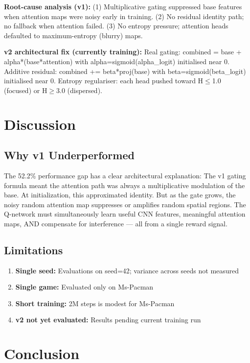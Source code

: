 \documentclass[11pt,a4paper]{article}
\begin{document}
\textbf{Root-cause analysis (v1):}
(1) Multiplicative gating suppressed base features when attention maps were noisy early in training. 
(2) No residual identity path; no fallback when attention failed. 
(3) No entropy pressure; attention heads defaulted to maximum-entropy (blurry) maps.

\textbf{v2 architectural fix (currently training):}
Real gating: combined = base + alpha*(base*attention) with alpha=sigmoid(alpha\_logit) initialised near 0. 
Additive residual: combined += beta*proj(base) with beta=sigmoid(beta\_logit) initialised near 0. 
Entropy regulariser: each head pushed toward H$\le$1.0 (focused) or H$\ge$3.0 (dispersed).

\section{Discussion}

\subsection{Why v1 Underperformed}

The 52.2\% performance gap has a clear architectural explanation: The v1 gating formula meant the attention path was always a multiplicative modulation of the base. At initialization, this approximated identity. But as the gate grows, the noisy random attention map suppresses or amplifies random spatial regions. The Q-network must simultaneously learn useful CNN features, meaningful attention maps, AND compensate for interference --- all from a single reward signal.

\subsection{Limitations}

\begin{enumerate}
    \item \textbf{Single seed:} Evaluations on seed=42; variance across seeds not measured
    \item \textbf{Single game:} Evaluated only on Ms-Pacman
    \item \textbf{Short training:} 2M steps is modest for Ms-Pacman
    \item \textbf{v2 not yet evaluated:} Results pending current training run
\end{enumerate}

\section{Conclusion}
\end{document}
